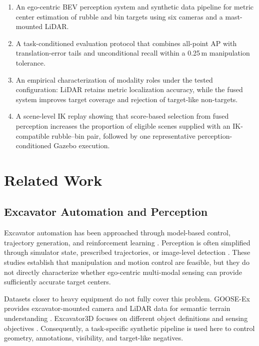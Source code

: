 \documentclass[conference]{IEEEtran}
\begin{document}
\begin{enumerate}
    \item An ego-centric BEV perception system and synthetic data pipeline for metric center estimation of rubble and bin targets using six cameras and a mast-mounted LiDAR.
    \item A task-conditioned evaluation protocol that combines all-point AP with translation-error tails and unconditional recall within a 0.25\,m manipulation tolerance.
    \item An empirical characterization of modality roles under the tested configuration: LiDAR retains metric localization accuracy, while the fused system improves target coverage and rejection of target-like non-targets.
    \item A scene-level IK replay showing that score-based selection from fused perception increases the proportion of eligible scenes supplied with an IK-compatible rubble--bin pair, followed by one representative perception-conditioned Gazebo execution.
\end{enumerate}

\section{Related Work}

\subsection{Excavator Automation and Perception}

Excavator automation has been approached through model-based control, trajectory generation, and reinforcement learning \cite{feng2018pid,zhang2019hybrid,jud2019trenching,egli2022ral}. Perception is often simplified through simulator state, prescribed trajectories, or image-level detection \cite{ataka2023icitee,ataka2024icitee,laksana2025ppo}. These studies establish that manipulation and motion control are feasible, but they do not directly characterize whether ego-centric multi-modal sensing can provide sufficiently accurate target centers.

Datasets closer to heavy equipment do not fully cover this problem. GOOSE-Ex provides excavator-mounted camera and LiDAR data for semantic terrain understanding \cite{gooseex2024}. Excavator3D focuses on different object definitions and sensing objectives \cite{agfusion2025}. Consequently, a task-specific synthetic pipeline is used here to control geometry, annotations, visibility, and target-like negatives.
\end{document}
